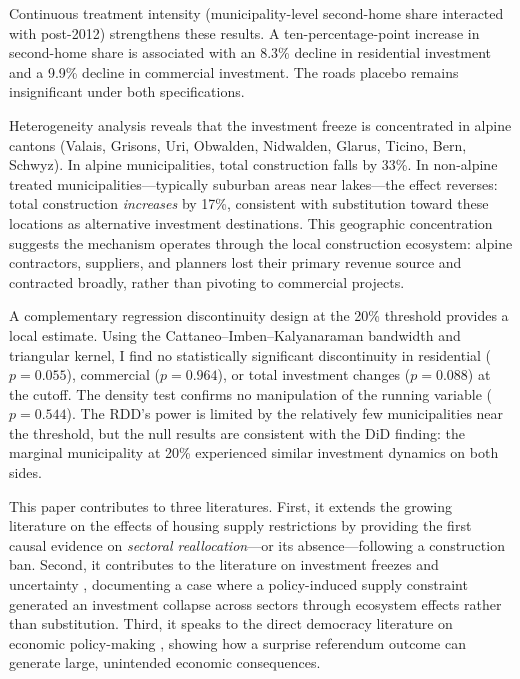 \documentclass[12pt]{article}
\begin{document}
Continuous treatment intensity (municipality-level second-home share interacted with post-2012) strengthens these results. A ten-percentage-point increase in second-home share is associated with an 8.3\% decline in residential investment and a 9.9\% decline in commercial investment. The roads placebo remains insignificant under both specifications.

Heterogeneity analysis reveals that the investment freeze is concentrated in alpine cantons (Valais, Grisons, Uri, Obwalden, Nidwalden, Glarus, Ticino, Bern, Schwyz). In alpine municipalities, total construction falls by 33\%. In non-alpine treated municipalities---typically suburban areas near lakes---the effect reverses: total construction \textit{increases} by 17\%, consistent with substitution toward these locations as alternative investment destinations. This geographic concentration suggests the mechanism operates through the local construction ecosystem: alpine contractors, suppliers, and planners lost their primary revenue source and contracted broadly, rather than pivoting to commercial projects.

A complementary regression discontinuity design at the 20\% threshold provides a local estimate. Using the Cattaneo--Imben--Kalyanaraman bandwidth and triangular kernel, I find no statistically significant discontinuity in residential ($p = 0.055$), commercial ($p = 0.964$), or total investment changes ($p = 0.088$) at the cutoff. The density test confirms no manipulation of the running variable ($p = 0.544$). The RDD's power is limited by the relatively few municipalities near the threshold, but the null results are consistent with the DiD finding: the marginal municipality at 20\% experienced similar investment dynamics on both sides.

This paper contributes to three literatures. First, it extends the growing literature on the effects of housing supply restrictions \citep{glaeser2005, gyourko2008, hilber2016} by providing the first causal evidence on \textit{sectoral reallocation}---or its absence---following a construction ban. Second, it contributes to the literature on investment freezes and uncertainty \citep{bloom2009, baker2016}, documenting a case where a policy-induced supply constraint generated an investment collapse across sectors through ecosystem effects rather than substitution. Third, it speaks to the direct democracy literature on economic policy-making \citep{matsusaka2004, funk2010}, showing how a surprise referendum outcome can generate large, unintended economic consequences.
\end{document}
